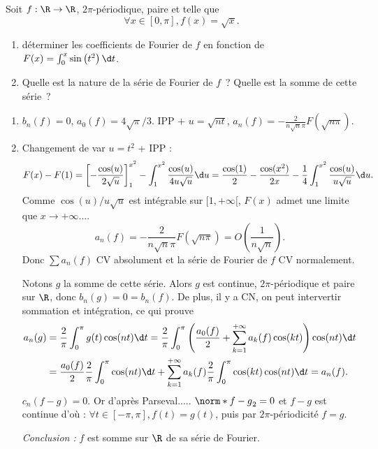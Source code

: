 \begin{enonce}
\begin{exercise}[ID={RMS 116 E808, Centrale MP 2005},subtitle={},tags={}]
Soit $f:\R\to\R$, $2\pi$-périodique, paire et telle que
\begin{equation*}
  \forall x\in[0,\pi], f(x)=\sqrt{x}.
\end{equation*}
\begin{enumerate}
  \item déterminer les coefficients de Fourier de $f$ en fonction de $F(x)=\int_0^x\sin\left( t^2 \right)\d t$.
  \item Quelle est la nature de la série de Fourier de $f$~?
    Quelle est la somme de cette série~?
\end{enumerate}
\end{exercise}
\begin{solution}
  \begin{enumerate}
    \item $b_n(f)=0$, $a_0(f)=4\sqrt\pi/3$.
      IPP + $u=\sqrt{nt}$, $a_n(f)=-\frac{2}{n\sqrt n\pi}F(\sqrt{n\pi})$.
    \item Changement de var $u=t^2$ + IPP :
      \begin{equation*}
        F(x)-F(1)
        =\left[-\frac{\cos(u)}{2\sqrt u}\right]_1^{x^2} - \int_1^{x^2}\frac{\cos(u)}{4u\sqrt u}\d u
        =\frac{\cos(1)}2-\frac{\cos(x^2)}{2x}-\frac14\int_1^{x^2}\frac{\cos(u)}{u\sqrt u}\d u.
      \end{equation*}
      Comme $\cos(u)/u\sqrt u$ est intégrable sur $[1,+\infty[$, $F(x)$ admet une limite que $x\to+\infty$....
      \begin{equation*}
        a_n(f)=-\frac2{n\sqrt n\pi}F\left( \sqrt{n\pi} \right) = O\left( \frac{1}{n\sqrt n} \right).
      \end{equation*}
      Donc $\sum a_n(f)$ CV absolument et la série de Fourier de $f$ CV normalement.

      Notons $g$ la somme de cette série.
      Alors $g$ est continue, $2\pi$-périodique et paire sur $\R$, donc
      $b_n(g)=0=b_n(f)$.
      De plus, il y  a CN, on peut intervertir sommation et intégration, ce qui prouve
      \begin{align*}
      a_n(g)
      &= \frac2\pi\int_0^\pi g(t)\cos(nt)\d t
      =\frac2\pi\int_0^\pi\left( \frac{a_0(f)}2 + \sum_{k=1}^{+\infty}a_k(f)\cos(kt) \right)\cos(nt)\d t\\
      &= \frac{a_0(f)}2\frac2\pi\int_0^\pi\cos(nt)\d t + \sum_{k=1}^{+\infty} a_k(f)\frac2\pi\int_0^\pi\cos(kt)\cos(nt)\d t = a_n(f).
      \end{align*}
      $c_n(f-g)=0$. Or d'après Parseval..... $\norm*{f-g}_2=0$ et $f-g$ est continue d'où : $\forall t\in[-\pi,\pi], f(t)=g(t)$, puis par $2\pi$-périodicité $f=g$.

      \noindent\emph{Conclusion : } $f$ est somme sur $\R$ de sa série de Fourier.
  \end{enumerate}
\end{solution}
\end{enonce}
